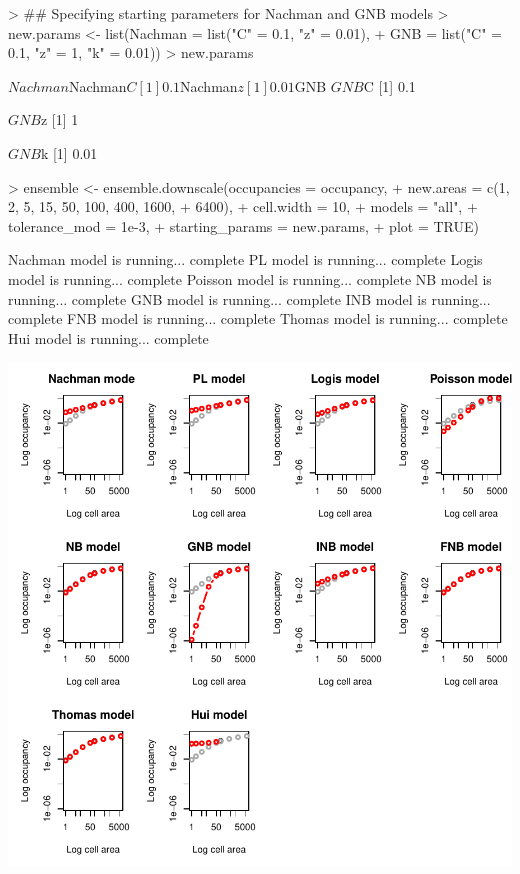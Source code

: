 \documentclass{article}[12pt, a4paper]
\begin{document}
\begin{Schunk}
\begin{Sinput}
> ## Specifying starting parameters for Nachman and GNB models
> new.params <- list(Nachman = list("C" = 0.1, "z" = 0.01),
+                    GNB = list("C" = 0.1, "z" = 1, "k" = 0.01))
> new.params
\end{Sinput}
\begin{Soutput}
$Nachman
$Nachman$C
[1] 0.1

$Nachman$z
[1] 0.01


$GNB
$GNB$C
[1] 0.1

$GNB$z
[1] 1

$GNB$k
[1] 0.01



\end{Soutput}
\end{Schunk}

\begin{Schunk}
\begin{Sinput}
> ensemble <- ensemble.downscale(occupancies = occupancy,
+                                new.areas = c(1, 2, 5, 15, 50, 100, 400, 1600,
+                                              6400),
+                                cell.width = 10,
+                                models = "all",
+                                tolerance_mod = 1e-3,
+                                starting_params = new.params,
+                                plot = TRUE)
\end{Sinput}
\begin{Soutput}
Nachman model is running...  complete 
PL model is running...  complete 
Logis model is running...  complete 
Poisson model is running...  complete 
NB model is running...  complete 
GNB model is running...  complete 
INB model is running...  complete 
FNB model is running...  complete 
Thomas model is running...  complete 
Hui model is running...  complete 

\end{Soutput}
\end{Schunk}
\includegraphics{Downscaling-downscale26}
\end{document}
